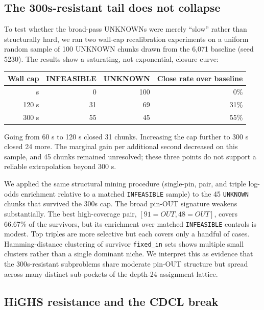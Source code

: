\subsection{The 300s-resistant tail does not collapse}\label{the-300s-resistant-tail-does-not-collapse}

To test whether the broad-pass UNKNOWNs were merely ``slow'' rather than
structurally hard, we ran two wall-cap recalibration experiments on a uniform
random sample of 100 UNKNOWN chunks drawn from the 6,071 baseline (seed
5230). The
results show a saturating, not exponential, closure curve:

{\def\LTcaptype{none} %
\begin{longtable}[]{@{}rrrr@{}}
\toprule\noalign{}
Wall cap & INFEASIBLE & UNKNOWN & Close rate over baseline \\
\midrule\noalign{}
\endhead
\bottomrule\noalign{}
\endlastfoot
60 s & 0 & 100 & 0\% \\
120 s & 31 & 69 & 31\% \\
300 s & 55 & 45 & 55\% \\
\end{longtable}
}

Going from 60 s to 120 s closed 31 chunks. Increasing the cap further to
300 s closed 24 more. The marginal gain per additional second decreased on
this sample, and 45 chunks remained unresolved; these three points do not
support a reliable extrapolation beyond 300 s.

We applied the same structural mining procedure (single-pin, pair, and triple
log-odds enrichment relative to a matched \texttt{INFEASIBLE} sample) to the 45
\texttt{UNKNOWN} chunks that survived the 300s cap. The broad pin-OUT signature
weakens substantially. The best high-coverage pair, $[91=OUT, 48=OUT]$, covers
66.67\% of the survivors, but its enrichment over matched
\texttt{INFEASIBLE} controls is modest. Top triples are more selective but
each covers only a handful of cases. Hamming-distance
clustering of survivor \texttt{fixed\_in} sets shows multiple small clusters rather
than a single dominant niche. We interpret this as evidence that the
300s-resistant subproblems share moderate pin-OUT structure but spread
across many distinct sub-pockets of the depth-24 assignment lattice.

\subsection{HiGHS resistance and the CDCL break}\label{highs-resistance-and-the-cdcl-break}

